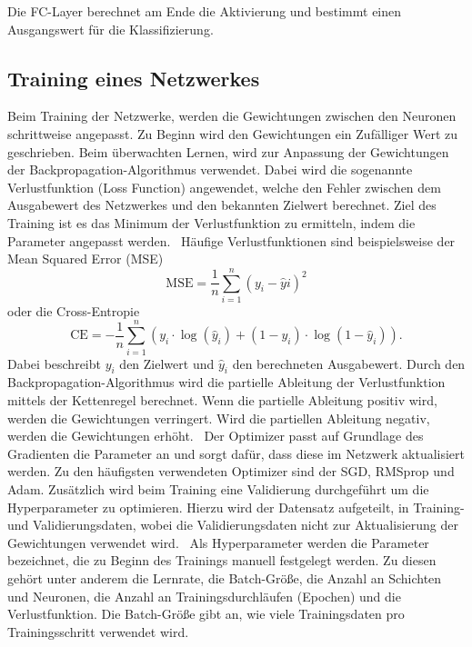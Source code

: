 Die FC-Layer berechnet am Ende die Aktivierung und bestimmt einen Ausgangswert für die Klassifizierung.


\subsection{Training eines Netzwerkes}

Beim Training der Netzwerke, werden die Gewichtungen zwischen den Neuronen schrittweise angepasst. 
Zu Beginn wird den Gewichtungen ein Zufälliger Wert zu geschrieben.
Beim überwachten Lernen, wird zur Anpassung der Gewichtungen der Backpropagation-Algorithmus verwendet.
Dabei wird die sogenannte Verlustfunktion (Loss Function) angewendet, welche den Fehler zwischen dem Ausgabewert des Netzwerkes und den bekannten Zielwert berechnet.
Ziel des Training ist es das Minimum der Verlustfunktion zu ermitteln, indem die Parameter angepasst werden.~\cite{datascience}
Häufige Verlustfunktionen sind beispielsweise der Mean Squared Error (MSE)
\begin{equation}
  \text{MSE}  =  \frac{1}{n} \sum_{i=1}^{n} (y_i - \hat{y}i)^2
\end{equation}
oder die Cross-Entropie  
\begin{equation}
\text{CE} = -\frac{1}{n} \sum_{i=1}^{n} \left( y_i \cdot \log(\hat{y}_i) + (1 - y_i) \cdot \log(1 - \hat{y}_i) \right).
\end{equation}
Dabei beschreibt $y_i$ den Zielwert und $\hat{y}_i$ den berechneten Ausgabewert.
Durch den Backpropagation-Algorithmus wird die partielle Ableitung der Verlustfunktion mittels der Kettenregel berechnet.
Wenn die partielle Ableitung positiv wird, werden die Gewichtungen verringert. 
Wird die partiellen Ableitung negativ, werden die Gewichtungen erhöht.~\cite{neuralnet}
Der Optimizer passt auf Grundlage des Gradienten die Parameter an und sorgt dafür, dass diese im Netzwerk aktualisiert werden.
Zu den häufigsten verwendeten Optimizer sind der SGD, RMSprop und Adam.
Zusätzlich wird beim Training eine Validierung durchgeführt um die Hyperparameter zu optimieren. 
Hierzu wird der Datensatz aufgeteilt, in Training- und Validierungsdaten, wobei die Validierungsdaten nicht zur Aktualisierung 
der Gewichtungen verwendet wird.~\cite{Yamashita2018}
Als Hyperparameter werden die Parameter bezeichnet, die zu Beginn des Trainings manuell festgelegt werden.
Zu diesen gehört unter anderem die Lernrate, die Batch-Größe, die Anzahl an Schichten und Neuronen, die Anzahl an Trainingsdurchläufen (Epochen)
und die Verlustfunktion.
Die Batch-Größe gibt an, wie viele Trainingsdaten pro Trainingsschritt verwendet wird.~\cite{datascience} 

